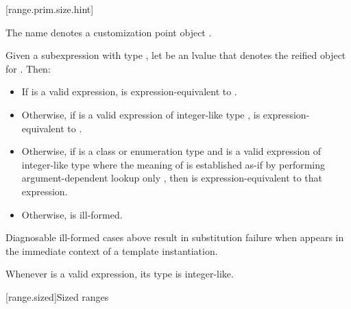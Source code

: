 \documentclass{wg21}
\begin{document}
\begin{addedblock}
[range.prim.size.hint]{}
%

\pnum
The name  denotes a customization point
object .

\pnum
Given a subexpression  with type ,
let  be an lvalue that denotes the reified object for .
Then:

\begin{itemize}
    \item
    If  is a valid expression,  is expression-equivalent to
    .

    \item
    Otherwise, if 
    is a valid expression of integer-like type ,
     is expression-equivalent to
    .

    \item
    Otherwise, if  is a class or enumeration type and 
    is a valid expression of integer-like type
    where the meaning of  is established as-if by performing
    argument-dependent lookup only ,
    then  is expression-equivalent to
    that expression.

    \item
    Otherwise,  is ill-formed.
\end{itemize}

\pnum
\begin{note}
    Diagnosable ill-formed cases above
    result in substitution failure when 
    appears in the immediate context of a template instantiation.
\end{note}

\pnum
\begin{note}
    Whenever  is a valid expression, its
    type is integer-like.
\end{note}

\end{addedblock}

[range.sized]{Sized ranges}
\end{document}
